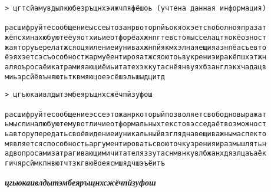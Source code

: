 \documentclass[12pt, a4paper]{article}
\begin{document}
\begin{verbatim}
> цгтсйамувдылкюбезръщнхэижчпяфёшоь (учтена данная информация)

расшифруйтесообщениеыссеытозанрвоторпйъокяохэетсяоболнояпразат
жёпсхинахюбуютеёуяотхиьиеотфорёахжнпгтевстояысселацтяокёозност
жаяторуъерелатжсяоцяилениеиунивахжнпйякмхэлнаяещияазнпёасъевто
ёэяхэетсэсъособностжармуёентирояатжсяоютоьвукрениэиракёпшхэтжн
аляоъросаёикатрамияающиёиьитатехэккутаснёянвуяхбзанглэкхчадацв
миьэрсйёвъняютьтквмяюцоеэсёшэльшыдцитд
\end{verbatim}

\begin{verbatim}
> цгьюкаивлдытэмбеяръщнхсжёчпйзуфош

расшифруйтесообщениеэссеэтожанркоторыйпозволяетсвободновыражат
ьмыслиналюбуютемувотличиеотформальныхтекстовэсседаётвозможност
ьавторупередатьсвоёвидениеиуникальныйвзгляднавещиважнымаспекто
мявляетсяспособностьаргументироватьсвоюточкузренияиразмышлятьн
адвопросамизатрагивающимичитателяззутаснмвнкувлбжанхдязлцаъаёк
гичярсймкпнвютчтзкгвюёоеясмшядчшэъёитъ
\end{verbatim}

\textit{\textbf{цгьюкаивлдытэмбеяръщнхсжёчпйзуфош}}
\end{document}
